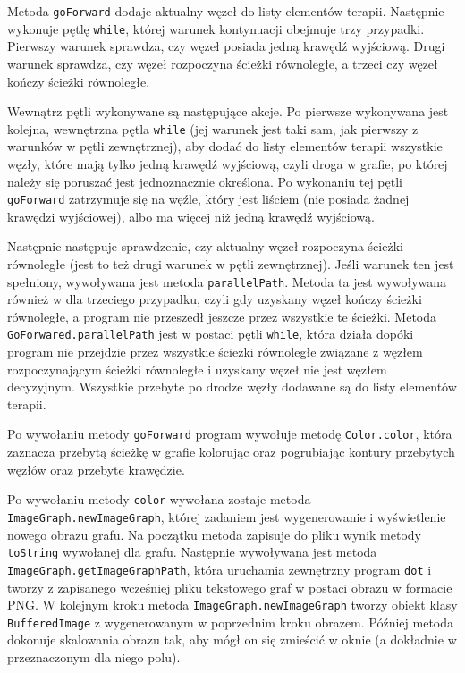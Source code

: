 Metoda \texttt{goForward} dodaje aktualny węzeł do listy elementów terapii. Następnie wykonuje pętlę \texttt{while}, której warunek kontynuacji obejmuje trzy przypadki. Pierwszy warunek sprawdza, czy węzeł posiada jedną krawędź wyjściową. Drugi warunek sprawdza, czy węzeł rozpoczyna ścieżki równoległe, a trzeci czy węzeł kończy ścieżki równoległe. 

Wewnątrz pętli wykonywane są następujące akcje. Po pierwsze wykonywana jest kolejna, wewnętrzna pętla \texttt{while} (jej warunek jest taki sam, jak pierwszy z warunków w pętli zewnętrznej), aby dodać do listy elementów terapii wszystkie węzły, które mają tylko jedną krawędź wyjściową, czyli droga w grafie, po której należy się poruszać jest jednoznacznie określona. Po wykonaniu tej pętli \texttt{goForward} zatrzymuje się na węźle, który jest liściem (nie posiada żadnej krawędzi wyjściowej), albo ma więcej niż jedną krawędź wyjściową.

Następnie następuje sprawdzenie, czy aktualny węzeł rozpoczyna ścieżki równoległe (jest to też drugi warunek w pętli zewnętrznej). Jeśli warunek ten jest spełniony, wywoływana jest metoda \texttt{parallel\-Path}. Metoda ta jest wywoływana również w dla trzeciego przypadku, czyli gdy uzyskany węzeł kończy ścieżki równoległe, a program nie przeszedł jeszcze przez wszystkie te ścieżki. Metoda \texttt{GoForwared.parallel\-Path} jest w postaci pętli \texttt{while}, która działa dopóki program nie przejdzie przez wszystkie ścieżki równoległe związane z węzłem rozpoczynającym ścieżki równoległe i uzyskany węzeł 
nie jest węzłem decyzyjnym. Wszystkie przebyte po drodze węzły dodawane są do listy elementów terapii.  

Po wywołaniu metody \texttt{goForward} program wywołuje metodę \texttt{Color.color}, która zaznacza przebytą ścieżkę w grafie kolorując oraz pogrubiając kontury przebytych węzłów oraz przebyte krawędzie.
 
Po wywołaniu metody \texttt{color} wywołana zostaje metoda \texttt{ImageGraph.newImageGraph}, której zadaniem jest wygenerowanie i wyświetlenie nowego obrazu grafu. Na początku metoda zapisuje do pliku wynik metody \texttt{toString} wywołanej dla grafu. Następnie wywoływana jest metoda \texttt{ImageGraph.getImageGraphPath}, która uruchamia zewnętrzny program \texttt{dot} i tworzy z zapisanego wcześniej pliku tekstowego graf w postaci obrazu w formacie PNG. W kolejnym kroku metoda \texttt{ImageGraph.newImageGraph} tworzy obiekt klasy \texttt{BufferedImage} z wygenerowanym w poprzednim kroku obrazem. Później metoda dokonuje skalowania obrazu tak, aby mógł on się zmieścić w oknie (a dokładnie w przeznaczonym dla niego polu). 

